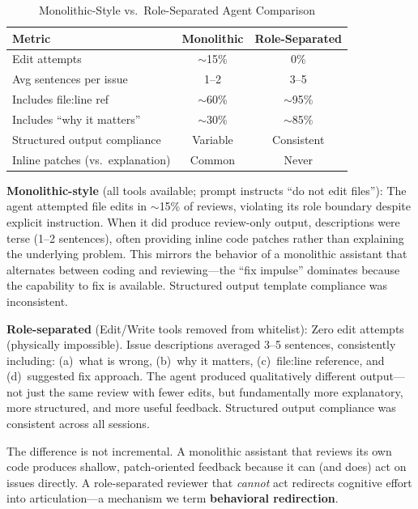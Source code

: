 \documentclass[11pt,a4paper]{article}
\begin{document}
\begin{table}[htbp]
\caption{Monolithic-Style vs.\ Role-Separated Agent Comparison}
\label{tab:scopingcomparison}
\centering
\footnotesize
\begin{tabular}{@{}lcc@{}}
\toprule
\textbf{Metric} & \textbf{Monolithic} & \textbf{Role-Separated} \\
\midrule
Edit attempts & $\sim$15\% & 0\% \\
Avg sentences per issue & 1--2 & 3--5 \\
Includes file:line ref & $\sim$60\% & $\sim$95\% \\
Includes ``why it matters'' & $\sim$30\% & $\sim$85\% \\
Structured output compliance & Variable & Consistent \\
Inline patches (vs.\ explanation) & Common & Never \\
\bottomrule
\end{tabular}
\end{table}

\textbf{Monolithic-style} (all tools available; prompt instructs ``do not edit files''): The agent attempted file edits in $\sim$15\% of reviews, violating its role boundary despite explicit instruction. When it did produce review-only output, descriptions were terse (1--2 sentences), often providing inline code patches rather than explaining the underlying problem. This mirrors the behavior of a monolithic assistant that alternates between coding and reviewing---the ``fix impulse'' dominates because the capability to fix is available. Structured output template compliance was inconsistent.

\textbf{Role-separated} (Edit/Write tools removed from whitelist): Zero edit attempts (physically impossible). Issue descriptions averaged 3--5 sentences, consistently including: (a)~what is wrong, (b)~why it matters, (c)~file:line reference, and (d)~suggested fix approach. The agent produced qualitatively different output---not just the same review with fewer edits, but fundamentally more explanatory, more structured, and more useful feedback. Structured output compliance was consistent across all sessions.

The difference is not incremental. A monolithic assistant that reviews its own code produces shallow, patch-oriented feedback because it can (and does) act on issues directly. A role-separated reviewer that \textit{cannot} act redirects cognitive effort into articulation---a mechanism we term \textbf{behavioral redirection}.
\end{document}
